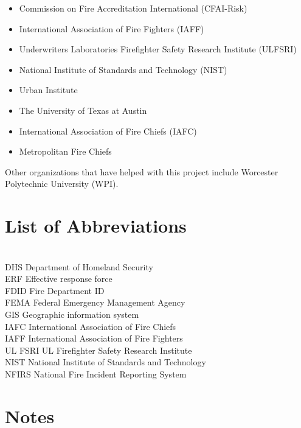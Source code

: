 \documentclass[12pt,oneside]{book}
\begin{document}
\begin{itemize}
\item Commission on Fire Accreditation International (CFAI-Risk)
\item International Association of Fire Fighters (IAFF)
\item Underwriters Laboratories Firefighter Safety Research Institute (ULFSRI)
\item National Institute of Standards and Technology (NIST)
\item Urban Institute
\item The University of Texas at Austin
\item International Association of Fire Chiefs (IAFC)
\item Metropolitan Fire Chiefs
\end{itemize}

Other organizations that have helped with this project include Worcester Polytechnic University (WPI).

\chapter{List of Abbreviations}

\begin{tabbing}
\hspace{1.5in} \= \\

DHS \> Department of Homeland Security \\
ERF \> Effective response force \\
FDID \> Fire Department ID \\
FEMA \> Federal Emergency Management Agency \\
GIS \>  Geographic information system \\
IAFC \> International Association of Fire Chiefs \\
IAFF \> International Association of Fire Fighters \\
UL FSRI \> UL Firefighter Safety Research Institute \\
NIST \> National Institute of Standards and Technology  \\
NFIRS \> National Fire Incident Reporting System \\
\end{tabbing}



\chapter*{Notes}
\end{document}
